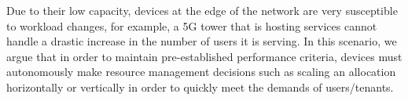 Due to their low capacity, devices at the edge of the network are very susceptible to workload changes, for example, a 5G tower that is hosting services cannot handle a drastic increase in the number of users it is serving. In this scenario, we argue that in order to maintain pre-established performance criteria, devices must autonomously make resource management decisions such as scaling an allocation horizontally or vertically in order to quickly meet the demands of users/tenants.











